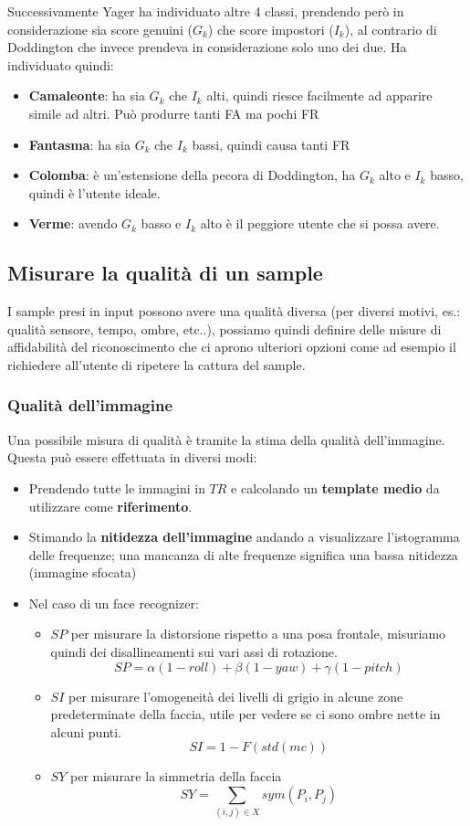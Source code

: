 \documentclass{article}
\begin{document}
Successivamente Yager ha individuato altre 4 classi, prendendo però in considerazione sia score genuini ($G_k$) che score impostori ($I_k$), al contrario di Doddington che invece prendeva in considerazione solo uno dei due. Ha individuato quindi:
\begin{itemize}
    \item \textbf{Camaleonte}: ha sia $G_k$ che $I_k$ alti, quindi riesce facilmente ad apparire simile ad altri. Può produrre tanti FA ma pochi FR
    \item \textbf{Fantasma}: ha sia $G_k$ che $I_k$ bassi, quindi causa tanti FR
    \item \textbf{Colomba}: è un'estensione della pecora di Doddington, ha $G_k$ alto e $I_k$ basso, quindi è l'utente ideale.
    \item \textbf{Verme}: avendo $G_k$ basso e $I_k$ alto è il peggiore utente che si possa avere.
\end{itemize}

\subsection{Misurare la qualità di un sample}
I sample presi in input possono avere una qualità diversa (per diversi motivi, es.: qualità sensore, tempo, ombre, etc..), possiamo quindi definire delle misure di affidabilità del riconoscimento che ci aprono ulteriori opzioni come ad esempio il richiedere all'utente di ripetere la cattura del sample.

\subsubsection{Qualità dell'immagine}
Una possibile misura di qualità è tramite la stima della qualità dell'immagine. Questa può essere effettuata in diversi modi:
\begin{itemize}
    \item Prendendo tutte le immagini in $TR$ e calcolando un \textbf{template medio} da utilizzare come \textbf{riferimento}.
    \item Stimando la \textbf{nitidezza dell'immagine} andando a visualizzare l'istogramma delle frequenze; una mancanza di alte frequenze significa una bassa nitidezza (immagine sfocata)
    \item Nel caso di un face recognizer:
    \begin{itemize}
        \item $SP$ per misurare la distorsione rispetto a una posa frontale, misuriamo quindi dei disallineamenti sui vari assi di rotazione. $$SP = \alpha (1-roll) + \beta (1-yaw) + \gamma (1-pitch)$$
        \item $SI$ per misurare l'omogeneità dei livelli di grigio in alcune zone predeterminate della faccia, utile per vedere se ci sono ombre nette in alcuni punti. $$SI = 1 - F(std(mc))$$
        \item $SY$ per misurare la simmetria della faccia $$SY = \sum_{(i,j) \in X} sym(P_i, P_j)$$
    \end{itemize}
\end{itemize}
\end{document}
